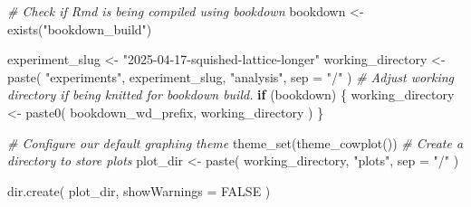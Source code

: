 \documentclass[
]{book}
\newenvironment{Shaded}{\begin{snugshade}}{\end{snugshade}}
\newcommand{\AttributeTok}[1]{\textcolor[rgb]{0.77,0.63,0.00}{#1}}
\newcommand{\CommentTok}[1]{\textcolor[rgb]{0.56,0.35,0.01}{\textit{#1}}}
\newcommand{\ConstantTok}[1]{\textcolor[rgb]{0.00,0.00,0.00}{#1}}
\newcommand{\ControlFlowTok}[1]{\textcolor[rgb]{0.13,0.29,0.53}{\textbf{#1}}}
\newcommand{\FunctionTok}[1]{\textcolor[rgb]{0.00,0.00,0.00}{#1}}
\newcommand{\NormalTok}[1]{#1}
\newcommand{\OtherTok}[1]{\textcolor[rgb]{0.56,0.35,0.01}{#1}}
\newcommand{\StringTok}[1]{\textcolor[rgb]{0.31,0.60,0.02}{#1}}
\begin{document}
\begin{Shaded}
\begin{Highlighting}[]
\CommentTok{\# Check if Rmd is being compiled using bookdown}
\NormalTok{bookdown }\OtherTok{\textless{}{-}} \FunctionTok{exists}\NormalTok{(}\StringTok{"bookdown\_build"}\NormalTok{)}
\end{Highlighting}
\end{Shaded}

\begin{Shaded}
\begin{Highlighting}[]
\NormalTok{experiment\_slug }\OtherTok{\textless{}{-}} \StringTok{"2025{-}04{-}17{-}squished{-}lattice{-}longer"}
\NormalTok{working\_directory }\OtherTok{\textless{}{-}} \FunctionTok{paste}\NormalTok{(}
  \StringTok{"experiments"}\NormalTok{,}
\NormalTok{  experiment\_slug,}
  \StringTok{"analysis"}\NormalTok{,}
  \AttributeTok{sep =} \StringTok{"/"}
\NormalTok{)}
\CommentTok{\# Adjust working directory if being knitted for bookdown build.}
\ControlFlowTok{if}\NormalTok{ (bookdown) \{}
\NormalTok{  working\_directory }\OtherTok{\textless{}{-}} \FunctionTok{paste0}\NormalTok{(}
\NormalTok{    bookdown\_wd\_prefix,}
\NormalTok{    working\_directory}
\NormalTok{  )}
\NormalTok{\}}
\end{Highlighting}
\end{Shaded}

\begin{Shaded}
\begin{Highlighting}[]
\CommentTok{\# Configure our default graphing theme}
\FunctionTok{theme\_set}\NormalTok{(}\FunctionTok{theme\_cowplot}\NormalTok{())}
\CommentTok{\# Create a directory to store plots}
\NormalTok{plot\_dir }\OtherTok{\textless{}{-}} \FunctionTok{paste}\NormalTok{(}
\NormalTok{  working\_directory,}
  \StringTok{"plots"}\NormalTok{,}
  \AttributeTok{sep =} \StringTok{"/"}
\NormalTok{)}

\FunctionTok{dir.create}\NormalTok{(}
\NormalTok{  plot\_dir,}
  \AttributeTok{showWarnings =} \ConstantTok{FALSE}
\NormalTok{)}
\end{Highlighting}
\end{Shaded}
\end{document}
